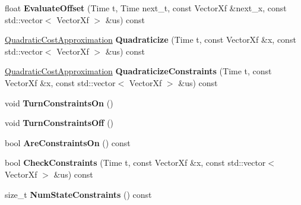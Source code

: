 \begin{DoxyCompactItemize}
\item 
float {\bfseries Evaluate\+Offset} (Time t, Time next\+\_\+t, const Vector\+Xf \&next\+\_\+x, const std\+::vector$<$ Vector\+Xf $>$ \&us) const \hypertarget{classilqgames_1_1_player_cost_a56bf9c10b7ffa6fbdfb1a9bff1ce65c3}{}\label{classilqgames_1_1_player_cost_a56bf9c10b7ffa6fbdfb1a9bff1ce65c3}

\item 
\hyperlink{structilqgames_1_1_quadratic_cost_approximation}{Quadratic\+Cost\+Approximation} {\bfseries Quadraticize} (Time t, const Vector\+Xf \&x, const std\+::vector$<$ Vector\+Xf $>$ \&us) const \hypertarget{classilqgames_1_1_player_cost_ad3962847f8eda8bcfecf2096e6abccb6}{}\label{classilqgames_1_1_player_cost_ad3962847f8eda8bcfecf2096e6abccb6}

\item 
\hyperlink{structilqgames_1_1_quadratic_cost_approximation}{Quadratic\+Cost\+Approximation} {\bfseries Quadraticize\+Constraints} (Time t, const Vector\+Xf \&x, const std\+::vector$<$ Vector\+Xf $>$ \&us) const \hypertarget{classilqgames_1_1_player_cost_a4ebb1982b3f3f852ee446ac379b3318a}{}\label{classilqgames_1_1_player_cost_a4ebb1982b3f3f852ee446ac379b3318a}

\item 
void {\bfseries Turn\+Constraints\+On} ()\hypertarget{classilqgames_1_1_player_cost_a6afcddbb08549f6e9e1167fdbe335306}{}\label{classilqgames_1_1_player_cost_a6afcddbb08549f6e9e1167fdbe335306}

\item 
void {\bfseries Turn\+Constraints\+Off} ()\hypertarget{classilqgames_1_1_player_cost_a24a3d61475539dfab3263b9cb30c4fa6}{}\label{classilqgames_1_1_player_cost_a24a3d61475539dfab3263b9cb30c4fa6}

\item 
bool {\bfseries Are\+Constraints\+On} () const \hypertarget{classilqgames_1_1_player_cost_acc8c6a6a143b8fd090d3087ac14eeb96}{}\label{classilqgames_1_1_player_cost_acc8c6a6a143b8fd090d3087ac14eeb96}

\item 
bool {\bfseries Check\+Constraints} (Time t, const Vector\+Xf \&x, const std\+::vector$<$ Vector\+Xf $>$ \&us) const \hypertarget{classilqgames_1_1_player_cost_a7c3268b3d9f2d1768096ac0c3adb7cb9}{}\label{classilqgames_1_1_player_cost_a7c3268b3d9f2d1768096ac0c3adb7cb9}

\item 
size\+\_\+t {\bfseries Num\+State\+Constraints} () const \hypertarget{classilqgames_1_1_player_cost_a3b3e0bac90840bac45c57b74c9efcf19}{}\label{classilqgames_1_1_player_cost_a3b3e0bac90840bac45c57b74c9efcf19}


\end{DoxyCompactItemize}
